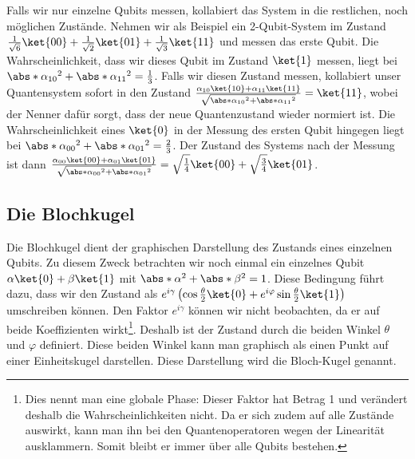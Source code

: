 Falls wir nur einzelne Qubits messen, kollabiert das System in die restlichen, noch möglichen Zustände. Nehmen wir als Beispiel ein 2-Qubit-System im Zustand $\frac{1}{\sqrt{6}}\ket{00} + \frac{1}{\sqrt{2}}\ket{01} + \frac{1}{\sqrt{3}}\ket{11}$ und messen das erste Qubit. Die Wahrscheinlichkeit, dass wir dieses Qubit im Zustand $\ket{1}$ messen, liegt bei $\abs*{\alpha_{10}}^2 + \abs*{\alpha_{11}}^2 = \frac{1}{3}$. Falls wir diesen Zustand messen, kollabiert unser Quantensystem sofort in den Zustand $\frac{\alpha_{10}\ket{10} + \alpha_{11}\ket{11}}{\sqrt{\abs*{\alpha_{10}}^2 + \abs*{\alpha_{11}}^2}} = \ket{11}$, wobei der Nenner dafür sorgt, dass der neue Quantenzustand wieder normiert ist. Die Wahrscheinlichkeit eines $\ket{0}$ in der Messung des ersten Qubit hingegen liegt bei $\abs*{\alpha_{00}}^2 + \abs*{\alpha_{01}}^2 = \frac{2}{3}$. Der Zustand des Systems nach der Messung ist dann $\frac{\alpha_{00}\ket{00} + \alpha_{01}\ket{01}}{\sqrt{\abs*{\alpha_{00}}^2 + \abs*{\alpha_{01}}^2}} = \sqrt{\frac{1}{4}}\ket{00} + \sqrt{\frac{3}{4}}\ket{01}$.

\subsection{Die Blochkugel}
Die Blochkugel dient der graphischen Darstellung des Zustands eines einzelnen Qubits. Zu diesem Zweck betrachten wir noch einmal ein einzelnes Qubit $\alpha\ket{0} + \beta\ket{1}$ mit $\abs*{\alpha}^2 + \abs*{\beta}^2 = 1$. Diese Bedingung führt dazu, dass wir den Zustand als $e^{i\gamma}\left(\cos\frac{\theta}{2}\ket{0} + e^{i\varphi}\sin\frac{\theta}{2}\ket{1}\right)$ umschreiben können. Den Faktor $e^{i\gamma}$ können wir nicht beobachten, da er auf beide Koeffizienten wirkt\footnote{Dies nennt man eine globale Phase: Dieser Faktor hat Betrag 1 und verändert deshalb die Wahrscheinlichkeiten nicht. Da er sich zudem auf alle Zustände auswirkt, kann man ihn bei den Quantenoperatoren wegen der Linearität ausklammern. Somit bleibt er immer über alle Qubits bestehen.}. Deshalb ist der Zustand durch die beiden Winkel $\theta$ und $\varphi$ definiert. Diese beiden Winkel kann man graphisch als einen Punkt auf einer Einheitskugel darstellen. Diese Darstellung wird die Bloch-Kugel genannt.


